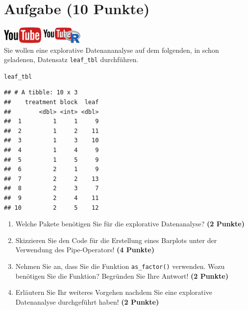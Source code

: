 \documentclass[a4paper, 10pt]{scrartcl}\usepackage[]{graphicx}\usepackage[]{xcolor}
\makeatletter
\newcommand{\hlstd}[1]{\textcolor[rgb]{0.345,0.345,0.345}{#1}}%
\newenvironment{kframe}{%
 \def\at@end@of@kframe{}%
 \ifinner\ifhmode%
  \def\at@end@of@kframe{\end{minipage}}%
  \begin{minipage}{\columnwidth}%
 \fi\fi%
 \def\FrameCommand##1{\hskip\@totalleftmargin \hskip-\fboxsep
 \colorbox{shadecolor}{##1}\hskip-\fboxsep
     \hskip-\linewidth \hskip-\@totalleftmargin \hskip\columnwidth}%
 \MakeFramed {\advance\hsize-\width
   \@totalleftmargin\z@ \linewidth\hsize
   \@setminipage}}%
 {\par\unskip\endMakeFramed%
 \at@end@of@kframe}
\newenvironment{knitrout}{}{} %
\makeatother
\begin{document}
 
\clearpage

\section{Aufgabe \hfill (10 Punkte)}

\hfill\href{https://youtu.be/WIgK_Oj_NW0}{\includegraphics[width =
  2cm]{img/youtube}}
\hspace{2Ex}
\href{https://youtu.be/JCdL7JrZo9o}{\includegraphics[width =
  2cm]{img/youtube_R}}\\[1Ex]


Sie wollen eine explorative Datenananalyse auf dem folgenden, in \Rlogo schon geladenen, Datensatz \texttt{leaf\_tbl} durchf{\"u}hren.



\begin{knitrout}
\color{fgcolor}\begin{kframe}
\begin{alltt}
\hlstd{leaf_tbl}
\end{alltt}
\begin{verbatim}
## # A tibble: 10 x 3
##    treatment block  leaf
##        <dbl> <int> <dbl>
##  1         1     1     9
##  2         1     2    11
##  3         1     3    10
##  4         1     4     9
##  5         1     5     9
##  6         2     1     9
##  7         2     2    13
##  8         2     3     7
##  9         2     4    11
## 10         2     5    12
\end{verbatim}
\end{kframe}
\end{knitrout}

\begin{enumerate}
\item Welche \Rlogo Pakete ben{\"o}tigen Sie f{\"u}r die explorative Datenanalyse?
  \textbf{(2 Punkte)} 
\item Skizzieren Sie den \Rlogo Code f{\"u}r die Erstellung eines
  Barplots unter der Verwendung des Pipe-Operators! \textbf{(4 Punkte)}
\item Nehmen Sie an, dass Sie die Funktion \texttt{as\_factor()}
  verwenden. Wozu ben{\"o}tigen Sie die Funktion? Begr{\"u}nden Sie Ihre Antwort!
  \textbf{(2 Punkte)}
\item Erl{\"a}utern Sie Ihr weiteres Vorgehen nachdem Sie eine explorative
  Datenanalyse durchgef{\"u}hrt haben! \textbf{(2 Punkte)}
\end{enumerate}
\end{document}
